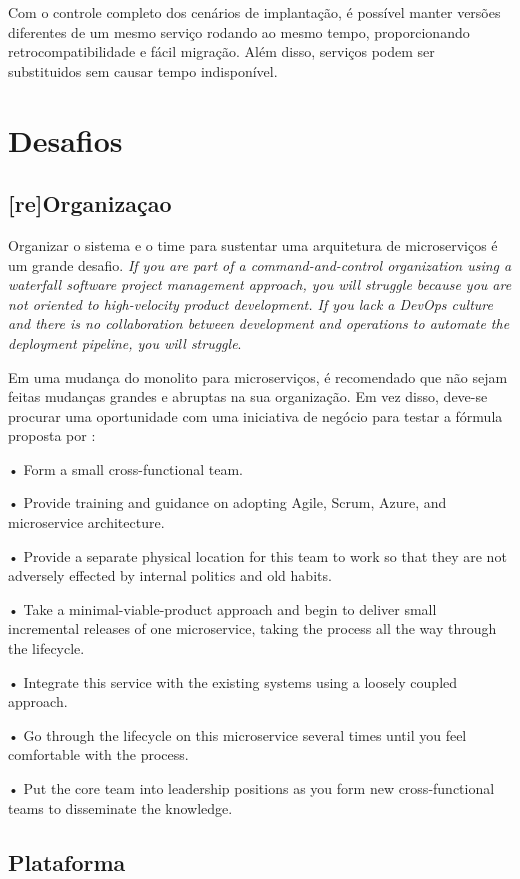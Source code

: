 Com o controle completo dos cenários de implantação, é possível manter versões diferentes de um mesmo serviço rodando ao mesmo tempo, proporcionando retrocompatibilidade e fácil migração. Além disso, serviços podem ser substituidos sem causar tempo indisponível.

\section{Desafios}

\subsection{[re]Organizaçao}

Organizar o sistema e o time para sustentar uma arquitetura de microserviços é um grande desafio. \emph{If you are part of a command-and-control organization using a waterfall software project management approach, you will struggle because you are not oriented to high-velocity product development. If you lack a DevOps culture and there is no collaboration between development and operations to automate the deployment pipeline, you will struggle}.

Em uma mudança do monolito para microserviços, é recomendado que não sejam feitas mudanças grandes e abruptas na sua organização. Em vez disso, deve-se procurar uma oportunidade com uma iniciativa de negócio para testar a fórmula proposta por  : 

•	 Form a small cross-functional team.

•	 Provide training and guidance on adopting Agile, Scrum, Azure, and microservice architecture.

•	 Provide a separate physical location for this team to work so that they are not adversely effected by internal politics and old habits.

•	 Take a minimal-viable-product approach and begin to deliver small incremental releases of one microservice, taking the process all the way through the lifecycle.

•	 Integrate this service with the existing systems using a loosely coupled approach.

•	 Go through the lifecycle on this microservice several times until you feel comfortable with the process.

•	 Put the core team into leadership positions as you form new cross-functional teams to disseminate the knowledge.

\subsection{Plataforma}


